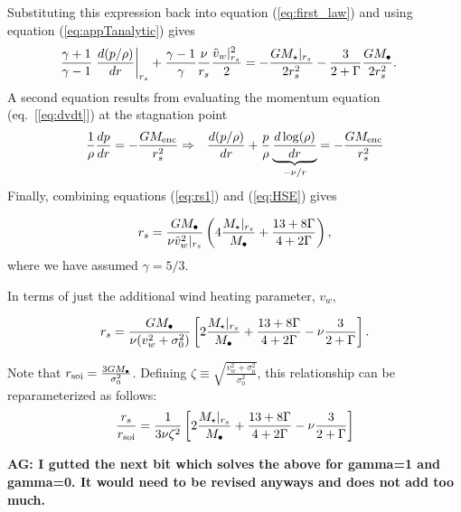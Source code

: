 Substituting this expression back into equation (\ref{eq:first_law}) and using equation (\ref{eq:appTanalytic}) gives
\begin{align}
&\frac{\gamma+1}{\gamma-1}
\left.\frac{d (p/\rho)}{d r}\right|_{r_s}+ \frac{\gamma-1}{\gamma} \frac{\nu}{r_s} \frac{\tilde{v}_{w}|_{r_s}^{2}}{2} = -\frac{G
  M_{\star}|_{r_s}}{2 r_s^2} -\frac{3}{2+\Gamma} \frac{G M_{\bullet}}{2 r_s^2}.  \label{eq:rs1}
\end{align}
A second equation results from evaluating the momentum equation (eq.~[\ref{eq:dvdt}]) at the stagnation point
\begin{align}
&\frac{1}{\rho}\frac{d p}{d r}=- \frac{GM_{\rm enc}}{r_s^2} \Rightarrow
&\frac{d (p/\rho)}{d r}+\frac{p}{\rho}
\underbrace{\frac{d\log(\rho)}{dr}}_{-\nu/r} = -\frac{G M_{\rm enc}}{r_s^2} \label{eq:HSE}
\end{align}
Finally, combining equations (\ref{eq:rs1}) and (\ref{eq:HSE}) gives 

\begin{align}
r_s=\frac{G M_{\bullet}}{\nu \tilde{v}_{w}^{2}|_{r_s}}\left(4
  \frac{M_{\star}|_{r_s}}{M_{\bullet}} +\frac{13+ 8\Gamma}{4+2\Gamma}\right),
\end{align}
where we have assumed $\gamma=5/3$.

In terms of just the additional wind heating parameter, $v_w$,

\begin{align}
  r_s=\frac{G M_{\bullet}}{\nu (v_w^{2}+\sigma_0^2)}\left[2
    \frac{M_{\star}|_{r_s}}{M_{\bullet}} +\frac{13+
      8\Gamma}{4+2\Gamma}-\nu \frac{3}{2+\Gamma}\right].
\label{eq:rs2main}
\end{align}


Note that $r_{\rm soi}=\frac{3 G M_{\bullet}}{\sigma_0^2}$. Defining $\zeta \equiv
\sqrt{\frac{v_w^2+\sigma_0^2}{\sigma_0^2}}$, this relationship can be reparameterized as
follows:
\begin{align}
  \frac{r_s}{r_{\rm soi}}=\frac{1}{3\nu \zeta^2} \left[2\frac{M_{\star}|_{r_s}}{M_{\bullet}} +\frac{13+8\Gamma}{4+2\Gamma}-\nu \frac{3}{2+\Gamma}\right]
  \label{eq:rsRinf}
\end{align}

{\bf AG: I gutted the next bit which solves the above for gamma=1 and
  gamma=0. It would need to be revised anyways and does not add too much.}


